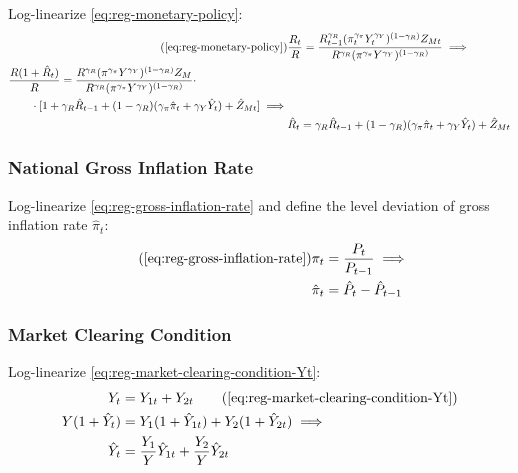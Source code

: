 \documentclass[../thesis.tex]{subfiles}
\begin{document}
Log-linearize \ref{eq:reg-monetary-policy}:
\begin{align}
	\tag{\ref{eq:reg-monetary-policy}}
	& \frac{R_{t}}{R} = \frac{R_{t-1}^{\gamma_R} (\pi_t^{\gamma_\pi} Y_{t}^{\gamma_Y})^{(1-\gamma_R)} Z_{Mt}}{R^{\gamma_R} (\pi^{\gamma_\pi} Y^{\gamma_Y})^{(1-\gamma_R)}} \implies \\
	\begin{split}
		& \frac{R(1+ \hat{R}_t)}{R} = \frac{ R^{\gamma_R} (\pi^{\gamma_\pi} Y^{\gamma_Y})^{(1-\gamma_R)} Z_{M}}{R^{\gamma_R} (\pi^{\gamma_\pi} Y^{\gamma_Y})^{(1-\gamma_R)}} \cdot \\
		& \qquad \cdot [1+ \gamma_R \hat{R}_{t-1} + (1-\gamma_R)(\gamma_\pi \hat{\pi}_t + \gamma_Y \hat{Y}_t) + \hat{Z}_{Mt}] \implies
	\end{split} \nonumber \\
	& \hat{R}_t = \gamma_R \hat{R}_{t-1} + (1-\gamma_R)(\gamma_\pi \hat{\pi}_t + \gamma_Y \hat{Y}_t) + \hat{Z}_{Mt} \label{eq:reg-ll-monetary-policy}
\end{align}


\subsubsection*{National Gross Inflation Rate}

Log-linearize \ref{eq:reg-gross-inflation-rate} and define the level deviation of gross inflation rate $\hat{\pi}_t$:
\begin{align}
	\tag{\ref{eq:reg-gross-inflation-rate}}
	\pi_{t} &= \frac{P_{t}}{P_{t-1}} \implies \\
	\hat{\pi}_{t} &= \hat{P}_{t} - \hat{P}_{t-1}
	\label{eq:reg-level-dev-gross-inflation-rate}
\end{align}


\subsubsection*{Market Clearing Condition}

Log-linearize \ref{eq:reg-market-clearing-condition-Yt}:
\begin{alignat}{2}
	Y_{t} &= Y_{1 t} + Y_{2 t} \tag{\ref{eq:reg-market-clearing-condition-Yt}} \\
	Y (1 +\hat{Y}_{t}) &= Y_{1} (1 +\hat{Y}_{1t}) + Y_{2} (1 +\hat{Y}_{2t}) \implies \nonumber \\
	\hat{Y}_{t} &= \frac{Y_{1}}{Y} \hat{Y}_{1t} + \frac{Y_{2}}{Y} \hat{Y}_{2t} \label{eq:reg-ll-market-clearing-condition-Yt-2}
\end{alignat}
\end{document}

